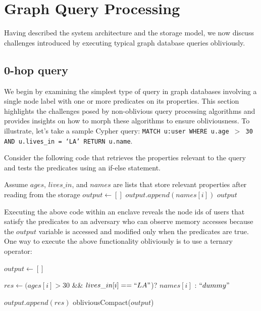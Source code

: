 \vspace{-0.5em}
\section{Graph Query Processing}
\label{sec:graph_qp}

Having described the system architecture and the storage model, we now
discuss challenges introduced by executing typical graph database queries 
obliviously.

\vspace{-1em}
\subsection{0-hop query}
\label{sub:0-hop}

We begin by examining the simplest type of query in graph databases involving a single 
node label with one or more predicates on its properties. This section 
highlights the challenges posed by non-oblivious query processing algorithms and provides insights 
on how to morph these algorithms to ensure obliviousness. To illustrate, let's take a sample Cypher query:
\texttt{MATCH u:user WHERE u.age $>$ 30 AND u.lives\_in = `LA' RETURN u.name}.

Consider the following code that retrieves the properties relevant to the query
and tests the predicates using an if-else statement.

\noindent\hrulefill
\begin{algorithmic}[1]
        \State Assume $ages$, $lives\_in$, and $names$ are lists that store relevant properties after reading from the storage
        \State $output \gets []$
                \State $output.append(names[i])$
            \EndIf
        \EndFor
        \State \Return $output$
\end{algorithmic}
\noindent\hrulefill

\noindent Executing the above code within an enclave reveals the node ids of users that
satisfy the predicates to an adversary who can observe memory accesses because the 
$output$ variable is accessed and modified only when the predicates are true. 
One way to execute the above functionality obliviously is to use a ternary
operator:

\noindent\hrulefill
\begin{algorithmic}[1]
        \State $output \gets []$
            \State \parbox[t]{\linewidth}{$res \gets (ages[i] > 30$ \&\& $lives\_in[i] == ``LA"$)?\newline \null\hspace{9mm} $names[i]$ : $``dummy"$} 
            \State $output.append(res)$
        \EndFor
        \State \Return obliviousCompact($output$)
\end{algorithmic}
\noindent\hrulefill

